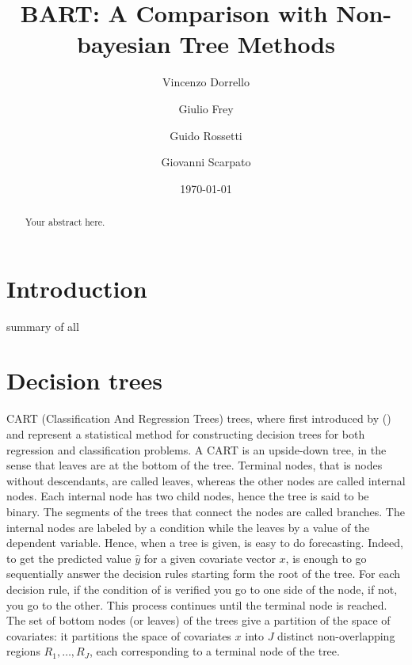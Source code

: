 \documentclass[a4paper,11pt]{article}
\title{BART: A Comparison with Non-bayesian Tree Methods}
\author{
    Vincenzo Dorrello 
    \and
    Giulio Frey 
    \and
    Guido Rossetti 
    \and
    Giovanni Scarpato 
}
\date{\today}
\begin{document}
\maketitle

\begin{abstract}
Your abstract here.
\end{abstract}


\section{Introduction}
summary of all
\cite{chipmanBARTBayesianAdditive2010}

\section{Decision trees}
CART (Classification And Regression Trees) trees, where first introduced by (\cite{Breiman et al. 1984}) and represent a statistical method for constructing decision trees for both regression and classification problems. 
A CART is an upside-down tree, in the sense that leaves are at the bottom of the tree. Terminal nodes, that is nodes without descendants, are called leaves, whereas the other nodes are called internal nodes. Each internal node has two child nodes, hence the tree is said to be binary. The segments of the trees that connect the nodes are called branches. The internal nodes are labeled by a condition while the leaves by a value of the dependent variable. Hence, when a tree is given, is easy to do forecasting. Indeed, to get the predicted value $\hat{y}$  for a given covariate vector $x$, is enough to go sequentially answer the decision rules starting form the root of the tree. For each decision rule, if the condition of is verified you go to one side of the node, if not, you go to the other. This process continues until the terminal node is reached. The set of bottom nodes (or leaves) of the trees give a partition of the space of covariates: it partitions the space of covariates $x$ into $J$ distinct non-overlapping regions $R_1, \ldots, R_J$, each corresponding to a terminal node of the tree. 
\end{document}
